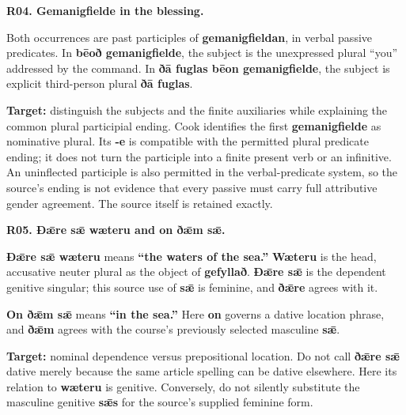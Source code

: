 \par\begin{minipage}{\linewidth}\raggedright
\textbf{R04. Gemanigfielde in the blessing.}

Both occurrences are past participles of \textbf{gemanigfieldan}, in verbal passive predicates. In \textbf{bēoð gemanigfielde}, the subject is the unexpressed plural “you” addressed by the command. In \textbf{ðā fuglas bēon gemanigfielde}, the subject is explicit third-person plural \textbf{ðā fuglas}.

\textbf{Target:} distinguish the subjects and the finite auxiliaries while explaining the common plural participial ending. Cook identifies the first \textbf{gemanigfielde} as nominative plural. Its \textbf{-e} is compatible with the permitted plural predicate ending; it does not turn the participle into a finite present verb or an infinitive. An uninflected participle is also permitted in the verbal-predicate system, so the source’s ending is not evidence that every passive must carry full attributive gender agreement. The source itself is retained exactly.

\end{minipage}\par\addvspace{4pt}

\par\begin{minipage}{\linewidth}\raggedright
\textbf{R05. Ðǣre sǣ wæteru and on ðǣm sǣ.}

\textbf{Ðǣre sǣ wæteru} means \textbf{“the waters of the sea.”} \textbf{Wæteru} is the head, accusative neuter plural as the object of \textbf{gefyllað}. \textbf{Ðǣre sǣ} is the dependent genitive singular; this source use of \textbf{sǣ} is feminine, and \textbf{ðǣre} agrees with it.

\textbf{On ðǣm sǣ} means \textbf{“in the sea.”} Here \textbf{on} governs a dative location phrase, and \textbf{ðǣm} agrees with the course’s previously selected masculine \textbf{sǣ}.

\textbf{Target:} nominal dependence versus prepositional location. Do not call \textbf{ðǣre sǣ} dative merely because the same article spelling can be dative elsewhere. Here its relation to \textbf{wæteru} is genitive. Conversely, do not silently substitute the masculine genitive \textbf{sǣs} for the source’s supplied feminine form.

\end{minipage}\par\addvspace{4pt}

